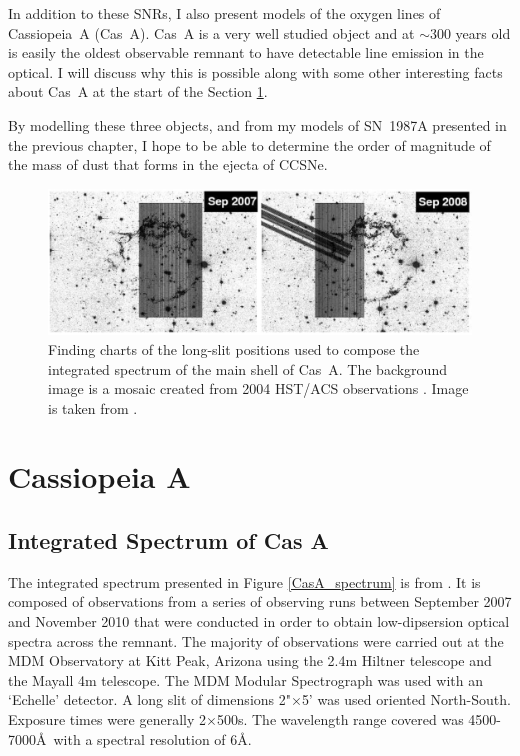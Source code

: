 In addition to these SNRs, I also present models of the oxygen lines of Cassiopeia~A (Cas~A).  Cas~A is a very well studied object and at $\sim$300 years old is easily the oldest observable remnant to have detectable line emission in the optical.  I will discuss why this is possible along with some other  interesting facts about Cas~A at the start of the Section \ref{CasA_intro}.  

By modelling these three objects, and from my models of SN~1987A presented in the previous chapter, I hope to be able to determine the order of magnitude of the mass of dust that forms in the ejecta of CCSNe.

\begin{figure}
\centering
\includegraphics[clip=true,scale=0.3, trim=0 0 0 0]{chapters/chapter6/figs/CasA/slit_positions.png}
\caption{Finding charts of the long-slit positions used to compose the integrated spectrum of the main shell of Cas~A.  The background image is a mosaic created from 2004 HST/ACS observations \citep{Fesen2006a}.  Image is taken from \citet{Milisavljevic2013}.}
\label{CasA_slit_positions}
\end{figure}

\section{Cassiopeia A}
\label{CasA_intro}


\subsection{Integrated Spectrum of Cas A}

The integrated spectrum presented in Figure \ref{CasA_spectrum} is from \citet{Milisavljevic2013}.  It is composed of observations from a series of observing runs between September 2007 and November 2010 that were conducted in order to obtain low-dipsersion optical spectra across the remnant.  The majority of observations were carried out at the MDM Observatory at Kitt Peak, Arizona using the 2.4m Hiltner telescope and the Mayall 4m telescope.  The MDM Modular Spectrograph was used with an `Echelle' detector.  A long slit of dimensions 2"$\times$5' was used oriented North-South.  Exposure times were generally 2$\times$500s.  The wavelength range covered was 4500-7000\AA\ with a spectral resolution of 6\AA.  

